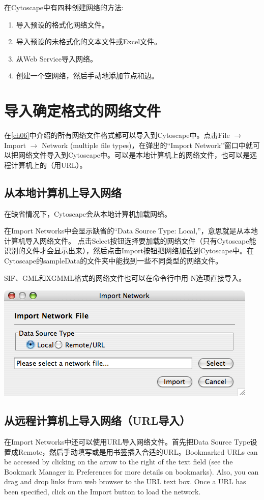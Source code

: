 在Cytoscape中有四种创建网络的方法:
\begin{enumerate}
\item 导入预设的格式化网络文件。
\item 导入预设的未格式化的文本文件或Excel文件。
\item 从Web Service导入网络。
\item 创建一个空网络，然后手动地添加节点和边。
\end{enumerate}
\section{导入确定格式的网络文件}

在\ref{ch06}中介绍的所有网络文件格式都可以导入到Cytoscape中。点击File $\rightarrow$ Import $\rightarrow$ Network (multiple file types)，在弹出的``Import Network''窗口中就可以把网络文件导入到Cytoscape中。可以是本地计算机上的网络文件，也可以是远程计算机上的（用URL）。

 \subsection{从本地计算机上导入网络}
在缺省情况下，Cytoscape会从本地计算机加载网络。

在Import Networks中会显示缺省的``Data Source Type: Local,''，意思就是从本地计算机导入网络文件。 点击Select按钮选择要加载的网络文件（只有Cytoscape能识别的文件才会显示出来），然后点击Import按钮把网络加载到Cytoscape中。在Cytoscape的sampleData的文件夹中能找到一些不同类型的网络文件。 

SIF、GML和XGMML格式的网络文件也可以在命令行中用-N选项直接导入。

\begin{center}
\includegraphics[width=\textwidth]{images/network_import_dialog1_25.png} 
\end{center}

\subsection{从远程计算机上导入网络（URL导入）}
在Import Networks中还可以使用URL导入网络文件。首先把Data Source Type设置成Remote，然后手动填写或是用书签插入合适的URL。Bookmarked URLs can be accessed by clicking on the arrow to the right of the text field (see the Bookmark Manager in Preferences for more details on bookmarks). Also, you can drag and drop links from web browser to the URL text box. Once a URL has been specified, click on the Import button to load the network. 

